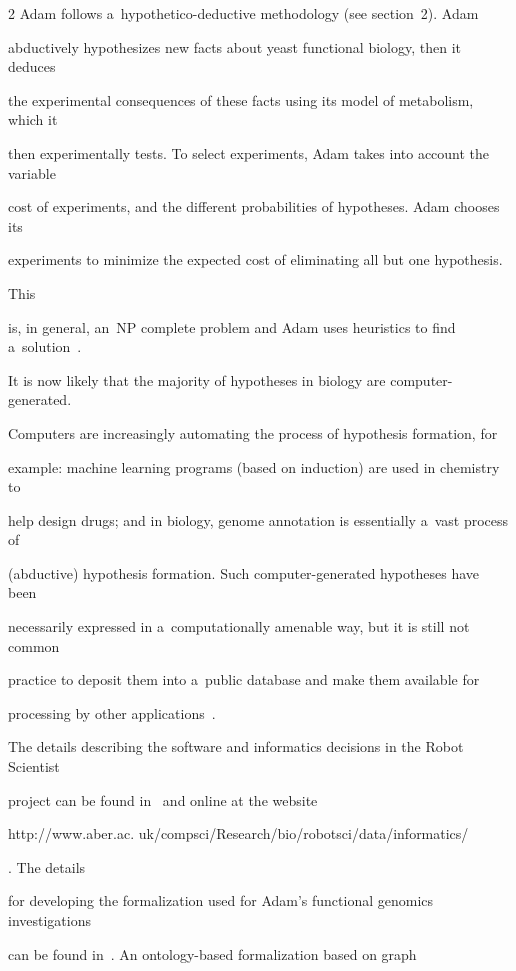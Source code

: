 \begin{multicols}{2}
  Adam follows a~hypothetico-deductive methodology (see section~2). Adam


abductively hypothesizes new facts about yeast functional biology, then it deduces


the experimental consequences of these facts using its model of metabolism, which it


then experimentally tests. To select experiments, Adam takes into account the variable


cost of experiments, and the different probabilities of hypotheses. Adam chooses its


experiments to minimize the expected cost of eliminating all but one hypothesis.


This


is, in general, an~NP complete problem and Adam uses heuristics to find a~solution~\cite{45-kl}.





  It is now likely that the majority of hypotheses in biology are computer-generated.


Computers are increasingly automating the process of hypothesis formation, for


example: machine learning programs (based on induction) are used in chemistry to


help design drugs; and in biology, genome annotation is essentially a~vast process of


(abductive) hypothesis formation. Such computer-generated hypotheses have been


necessarily expressed in a~computationally amenable way, but it is still not common


practice to deposit them into a~public database and make them available for


processing by other applications~\cite{45-kl}.





  The details describing the software and informatics decisions in the Robot Scientist


project can be found in~\cite{45-kl, 53-kl} and online at the website {\sf


http://www.aber.ac. uk/compsci/Research/bio/robotsci/data/informatics/}. The details


for developing the formalization used for Adam's functional genomics investigations


can be found in~\cite{48-kl, 54-kl}. An ontology-based formalization based on graph



\end{multicols}
